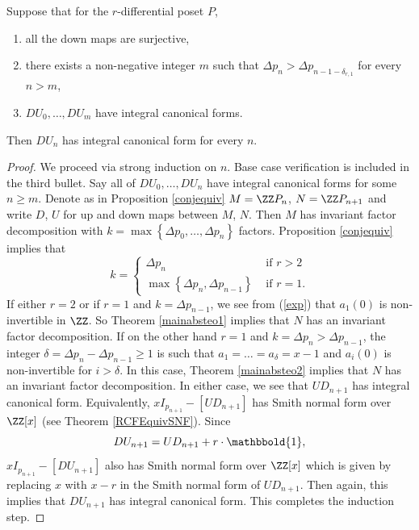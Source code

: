  
 \begin{theorem}  \label{mainteo} Suppose that  for the $ r $-differential poset  $  P  $, 
\begin{enumerate}[itemsep=0.1em]   
\item[$\bullet$]
all the down maps  are surjective,    
\item[$\bullet$]
there exists a non-negative integer $ m  $ such that   $   \Delta   p_{n}     >  \Delta p_{n-1 - \delta_{r,1}}  
 $ for every $ n > m   $, 
\item[$\bullet$] $ DU_{0}, \ldots, DU_{m}  $ have    integral canonical forms.  \end{enumerate}              
Then $ DU_{n}  $ has integral canonical   form  for  every  $   n $.                       
\end{theorem} 
\begin{proof}  We  proceed via strong induction 
on $ n $. Base case verification is included in the third bullet. Say all of $  DU_{0}, \ldots, DU_{n} $  have integral canonical forms for some $ n \geq  m  $.   Denote as in Proposition \ref{conjequiv}  $ M = \ZZ P_{n} $, $ N = \ZZ P_{n+1}  $ and write  $ D $, $ U $ for up and down maps between $ M $, $ N $. Then $ M $ has invariant factor decomposition with $ k = \max \left \{ \Delta p_{0}, \ldots, \Delta p_{n} \right \} $ factors. Proposition \ref{conjequiv} implies that $$ k = \begin{cases}   \Delta p_{n} & \text{ if }  r > 2 \\ \max \left \{ \Delta p_{n} , \Delta p_{n-1}  \right \}  & \text{ if } r = 1 . \end{cases} $$
  If either $ r = 2 $ or if $ r =1 $ and $ k = \Delta p_{n-1}  $, we see from (\ref{exp}) that $ a_{1}(0) $ is non-invertible in $ \ZZ $. So Theorem \ref{mainabsteo1}  implies   that $ N $ has an invariant factor  decomposition. If on the other hand 
  $ r = 1  $ and  $ k = \Delta p_{n}  > \Delta p_{n-1} $,  the integer $ \delta =  \Delta p_{n} - \Delta p_{n-1} \geq 1 $ is such that $ a_{1} = \ldots = a_{\delta} = x- 1 $ and $ a_{i}(0) $ is non-invertible for $ i > \delta $. In this case, Theorem \ref{mainabsteo2} implies that  $  N $ has an invariant factor decomposition. 
In either case, we see that  $  UD_{n+1} $ has integral canonical form. Equivalently, $  xI_{p_{n+1}}  - [UD_{n+1}] $ has Smith normal form over $ \ZZ[x] $ (see    Theorem \ref{RCFEquivSNF}).  Since $$ DU_{n+1} = UD_{n+1}  +  r   \cdot     \mathbbold{1} ,  $$   $ xI_{p_{n+1}} - [DU_{n+1}] $ also has Smith normal form over $ \ZZ[x] $ which is given by replacing $ x $ with $ x - r $ in the Smith normal form of $ UD_{n+1} $. Then again, this implies that $ DU_{n+1} $ has integral canonical form.  This completes the induction step. 
\end{proof}   


